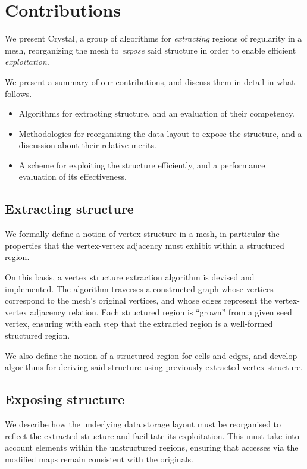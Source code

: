 \section{Contributions}

We present Crystal, a group of algorithms for \emph{extracting} regions of regularity in a mesh, reorganizing the mesh to \emph{expose} said structure in order to enable efficient \emph{exploitation}.

We present a summary of our contributions, and discuss them in detail in what follows.

\begin{itemize}
\item Algorithms for extracting structure, and an evaluation of their competency.
\item Methodologies for reorganising the data layout to expose the structure, and a discussion about their relative merits.
\item A scheme for exploiting the structure efficiently, and a performance evaluation of its effectiveness.
\end{itemize}


\subsection{Extracting structure}
We formally define a notion of vertex structure in a mesh, in particular the properties that the vertex-vertex adjacency must exhibit within a structured region.


On this basis, a vertex structure extraction algorithm is devised and implemented. The algorithm traverses a constructed graph whose vertices correspond to the mesh's original vertices, and whose edges represent the vertex-vertex adjacency relation. Each structured region is ``grown'' from a given seed vertex, ensuring with each step that the extracted region is a well-formed structured region.

We also define the notion of a structured region for cells and edges, and develop algorithms for deriving said structure using previously extracted vertex structure.


\subsection{Exposing structure}
We describe how the underlying data storage layout must be reorganised to reflect the extracted structure and facilitate its exploitation. This must take into account elements within the unstructured regions, ensuring that accesses via the modified maps remain consistent with the originals.

